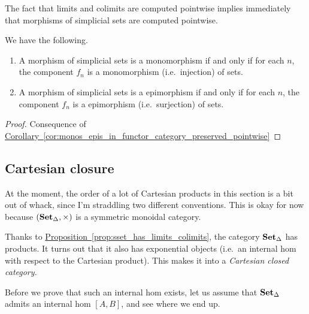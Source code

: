 \documentclass[main.tex]{subfiles}
\begin{document}
The fact that limits and colimits are computed pointwise implies immediately that morphisms of simplicial sets are computed pointwise.
\begin{lemma}
  \label{lemma:properties_of_morphisms_of_simplicial_sets}
  We have the following.
  \begin{enumerate}
    \item A morphism of simplicial sets is a monomorphism if and only if for each $n$, the component $f_{n}$ is a monomorphism (i.e.\ injection) of sets.

    \item A morphism of simplicial sets is a epimorphism if and only if for each $n$, the component $f_{n}$ is a epimorphism (i.e.\ surjection) of sets.
  \end{enumerate}
\end{lemma}
\begin{proof}
  Consequence of \hyperref[cor:monos_epis_in_functor_category_preserved_pointwise]{Corollary~\ref*{cor:monos_epis_in_functor_category_preserved_pointwise}}
\end{proof}

\subsection{Cartesian closure}
\label{ssc:cartesian_closure}

\begin{note}
  At the moment, the order of a lot of Cartesian products in this section is a bit out of whack, since I'm straddling two different conventions. This is okay for now because $(\operatorname{\mathbf{Set}_{\Delta}}, \times)$ is a symmetric monoidal category.
\end{note}

Thanks to \hyperref[prop:sset_has_limits_colimits]{Proposition~\ref*{prop:sset_has_limits_colimits}}, the category $\operatorname{\mathbf{Set}_{\Delta}}$ has products. It turns out that it also has exponential objects (i.e.\ an internal hom with respect to the Cartesian product). This makes it into a \emph{Cartesian closed category.}

Before we prove that such an internal hom exists, let us assume that $\operatorname{\mathbf{Set}_{\Delta}}$ admits an internal hom $[A, B]$, and see where we end up. 
\end{document}
